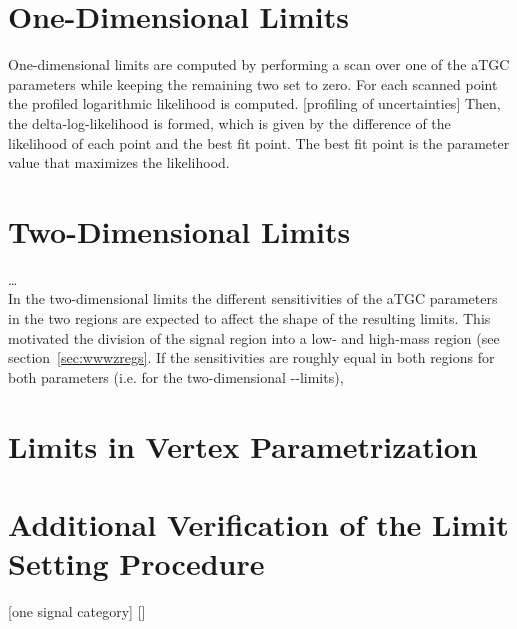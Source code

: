 \section{One-Dimensional Limits}
One-dimensional limits are computed by performing a scan over one of the aTGC parameters while keeping the remaining two set to zero. For each scanned point the profiled logarithmic likelihood is computed.
[profiling of uncertainties]
Then, the delta-log-likelihood is formed, which is given by the difference of the likelihood of each point and the best fit point. The best fit point is the parameter value that maximizes the likelihood. 


\section{Two-Dimensional Limits}
\label{sec:2dlims}
\dots \\
\noindent In the two-dimensional limits the different sensitivities of the aTGC parameters in the two regions are expected to affect the shape of the resulting limits. This motivated the division of the signal region into a low- and high-mass region (see section~\ref{sec:wwwzregs}. If the sensitivities are roughly equal in both regions for both parameters (i.e. for the two-dimensional \Tcwww -\Tccw -limits), 


\section{Limits in Vertex Parametrization}
\label{sec:vertex}


\section{Additional Verification of the Limit Setting Procedure}
[one signal category]
[]
